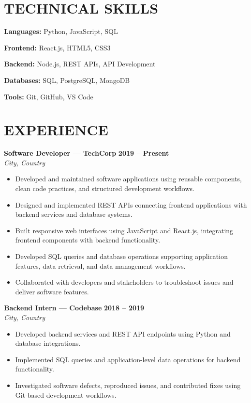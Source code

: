 \documentclass[10pt,a4paper]{article}
\newcommand{\resumeEntry}[3]{
    \textbf{#1} \hfill \textbf{#2}\\
    \textit{#3}
}
\begin{document}
\section*{TECHNICAL SKILLS}

\textbf{Languages:}
Python, JavaScript, SQL

\textbf{Frontend:}
React.js, HTML5, CSS3

\textbf{Backend:}
Node.js, REST APIs, API Development

\textbf{Databases:}
SQL, PostgreSQL, MongoDB

\textbf{Tools:}
Git, GitHub, VS Code



\section*{EXPERIENCE}

\resumeEntry
    {Software Developer --- TechCorp}
    {2019 -- Present}
    {City, Country}

\begin{itemize}

    \item Developed and maintained software applications using reusable
    components, clean code practices, and structured development workflows.

    \item Designed and implemented REST APIs connecting frontend applications
    with backend services and database systems.

    \item Built responsive web interfaces using JavaScript and React.js,
    integrating frontend components with backend functionality.

    \item Developed SQL queries and database operations supporting application
    features, data retrieval, and data management workflows.

    \item Collaborated with developers and stakeholders to troubleshoot issues
    and deliver software features.

\end{itemize}


\resumeEntry
    {Backend Intern --- Codebase}
    {2018 -- 2019}
    {City, Country}

\begin{itemize}

    \item Developed backend services and REST API endpoints using Python and
    database integrations.

    \item Implemented SQL queries and application-level data operations for
    backend functionality.

    \item Investigated software defects, reproduced issues, and contributed
    fixes using Git-based development workflows.

\end{itemize}
\end{document}
